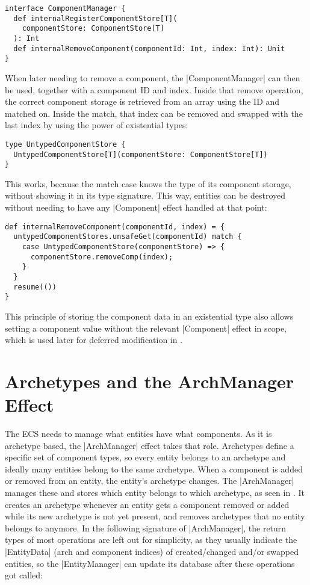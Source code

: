 \begin{lstlisting}[caption=ComponentManager signature]
interface ComponentManager {
  def internalRegisterComponentStore[T](
    componentStore: ComponentStore[T]
  ): Int
  def internalRemoveComponent(componentId: Int, index: Int): Unit
}
\end{lstlisting}

When later needing to remove a component, the |ComponentManager| can then be used, together with a component ID and index. Inside that remove operation, the correct component storage is retrieved from an array using the ID and matched on. Inside the match, that index can be removed and swapped with the last index by using the power of existential types:

\begin{lstlisting}
type UntypedComponentStore {
  UntypedComponentStore[T](componentStore: ComponentStore[T])
}
\end{lstlisting}

This works, because the match case knows the type of its component storage, without showing it in its type signature. This way, entities can be destroyed without needing to have any |Component| effect handled at that point:

\begin{lstlisting}
def internalRemoveComponent(componentId, index) = {
  untypedComponentStores.unsafeGet(componentId) match {
    case UntypedComponentStore(componentStore) => {
      componentStore.removeComp(index);
    }
  }
  resume(())
}
\end{lstlisting}

This principle of storing the component data in an existential type also allows setting a component value without the relevant |Component| effect in scope, which is used later for deferred modification in .

\section{Archetypes and the ArchManager Effect}

The ECS needs to manage what entities have what components. As it is archetype based, the |ArchManager| effect takes that role. Archetypes define a specific set of component types, so every entity belongs to an archetype and ideally many entities belong to the same archetype. When a component is added or removed from an entity, the entity's archetype changes. The |ArchManager| manages these and stores which entity belongs to which archetype, as seen in . It creates an archetype whenever an entity gets a component removed or added while its new archetype is not yet present, and removes archetypes that no entity belongs to anymore. In the following signature of |ArchManager|, the return types of most operations are left out for simplicity, as they usually indicate the |EntityData| (arch and component indices) of created/changed and/or swapped entities, so the |EntityManager| can update its database after these operations got called:

